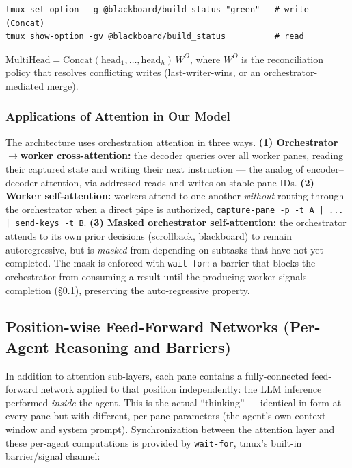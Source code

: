 \documentclass[10pt]{article}
\newcommand{\code}[1]{\texttt{\small #1}}
\begin{document}
\begin{lstlisting}
tmux set-option  -g @blackboard/build_status "green"   # write  (Concat)
tmux show-option -gv @blackboard/build_status          # read
\end{lstlisting}

$\mathrm{MultiHead} = \mathrm{Concat}(\mathrm{head}_1,\dots,\mathrm{head}_h)\,W^{O}$,
where $W^{O}$ is the reconciliation policy that resolves conflicting writes
(last-writer-wins, or an orchestrator-mediated merge).

\subsubsection{Applications of Attention in Our Model}

The architecture uses orchestration attention in three ways. \textbf{(1)
Orchestrator$\to$worker cross-attention:} the decoder queries over all worker panes,
reading their captured state and writing their next instruction --- the analog of
encoder--decoder attention, via addressed reads and writes on stable pane IDs.
\textbf{(2) Worker self-attention:} workers attend to one another \emph{without}
routing through the orchestrator when a direct pipe is authorized,
\code{capture-pane -p -t A | ... | send-keys -t B}. \textbf{(3) Masked orchestrator
self-attention:} the orchestrator attends to its own prior decisions (scrollback,
blackboard) to remain autoregressive, but is \emph{masked} from depending on subtasks
that have not yet completed. The mask is enforced with \code{wait-for}: a barrier that
blocks the orchestrator from consuming a result until the producing worker signals
completion (\S\ref{sec:ffn}), preserving the auto-regressive property.

\subsection{Position-wise Feed-Forward Networks (Per-Agent Reasoning and Barriers)}\label{sec:ffn}

In addition to attention sub-layers, each pane contains a fully-connected
feed-forward network applied to that position independently: the LLM inference
performed \emph{inside} the agent. This is the actual ``thinking'' --- identical in
form at every pane but with different, per-pane parameters (the agent's own context
window and system prompt). Synchronization between the attention layer and these
per-agent computations is provided by \code{wait-for}, tmux's built-in barrier/signal
channel:
\end{document}
